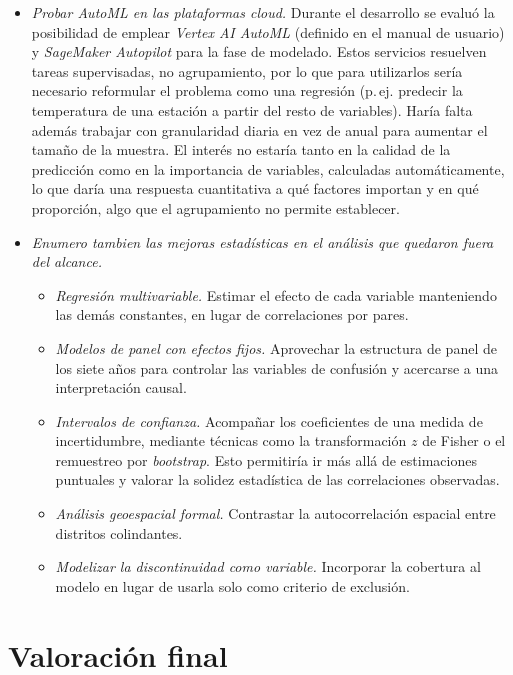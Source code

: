 \begin{itemize}
\begin{itemize}
		\item \emph{Probar AutoML en las plataformas cloud.} Durante el desarrollo se evaluó la posibilidad de emplear \textit{Vertex AI AutoML} (definido en el manual de usuario) y \textit{SageMaker Autopilot} para la fase de modelado. Estos servicios resuelven tareas supervisadas, no agrupamiento, por lo que para utilizarlos sería necesario reformular el problema como una regresión (p.\,ej. predecir la temperatura de una estación a partir del resto de variables). Haría falta además trabajar con granularidad diaria en vez de anual para aumentar el tamaño de la muestra. El interés no estaría tanto en la calidad de la predicción como en la importancia de variables, calculadas automáticamente, lo que daría una respuesta cuantitativa a qué factores importan y en qué proporción, algo que el agrupamiento no permite establecer.
		\item \emph{Enumero tambien las mejoras estadísticas en el análisis que quedaron fuera del alcance.}
		\begin{itemize}
			\item \emph{Regresión multivariable.} Estimar el efecto de cada variable manteniendo las demás constantes, en lugar de correlaciones por pares.

			\item \emph{Modelos de panel con efectos fijos.} Aprovechar la estructura de panel de los siete años para controlar las variables de confusión y acercarse a una interpretación causal.

			\item \emph{Intervalos de confianza.} Acompañar los coeficientes de una medida de incertidumbre, mediante técnicas como la transformación $z$ de Fisher o el remuestreo por \textit{bootstrap}. Esto permitiría ir más allá de estimaciones puntuales y valorar la solidez estadística de las correlaciones observadas.

			\item \emph{Análisis geoespacial formal.} Contrastar la autocorrelación espacial entre distritos colindantes.

			\item \emph{Modelizar la discontinuidad como variable.} Incorporar la cobertura al modelo en lugar de usarla solo como criterio de exclusión.
		\end{itemize}
	\end{itemize}
\end{itemize}

\section{Valoración final}

